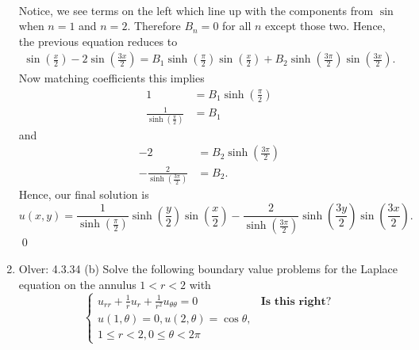 \documentclass[10pt]{amsart}
\theoremstyle{nonumberplain}
\begin{document}
\begin{enumerate}[label={\bf {\arabic*}:}]
\begin{align*}
\end{align*}
Notice, we see terms on the left which line up with the components from $\sin$ when $n = 1$ and $n = 2$.
Therefore $B_n = 0$ for all $n$ except those two.
Hence, the previous equation reduces to
\begin{align*}
\sin \left( \frac x 2 \right) - 2 \sin \left( \frac {3x}{2} \right) = B_1 \sinh \left( \frac \pi 2 \right) \sin \left( \frac x 2\right) + B_2 \sinh \left( \frac {3\pi} 2\right) \sin \left( \frac {3x} 2\right).
\end{align*}
Now matching coefficients this implies
\begin{align*}
1 &= B_1\sinh \left( \frac \pi 2 \right) \\
\frac 1 {\sinh \left( \frac \pi 2 \right)} &= B_1
\end{align*}
and
\begin{align*}
-2 &= B_2\sinh \left( \frac {3\pi} 2\right) \\
- \frac 2 {\sinh \left( \frac {3\pi} 2\right)} &= B_2.
\end{align*}
Hence, our final solution is
$$
u(x, y) = \frac 1 {\sinh \left( \frac \pi 2 \right)} \sinh \left( \frac y 2 \right) \sin \left( \frac x 2\right) - \frac 2 {\sinh \left( \frac {3\pi} 2\right)} \sinh \left( \frac {3y} 2\right) \sin \left( \frac {3x} 2\right).
$$
\qed \\


\newpage

\item Olver: 4.3.34 (b) Solve the following boundary value problems for the Laplace equation on the annulus $1 < r < 2$ with
$$
\begin{cases}
u_{rr} + \frac 1 ru_{r} + \frac 1 {r^2} u_{\theta\theta} = 0 &\textbf{Is this right?} \\
u(1, \theta) = 0, u(2, \theta) = \cos \theta, \\
1 \leq r < 2, 0 \leq \theta < 2\pi 
\end{cases}
$$


\end{enumerate}
\end{document}
